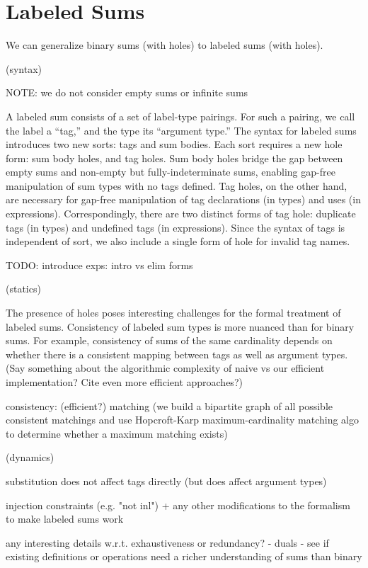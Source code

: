 \section{Labeled Sums}

We can generalize binary sums (with holes) to labeled sums (with holes).

(syntax)






NOTE: we do not consider empty sums or infinite sums

A labeled sum consists of a set of label-type pairings.
For such a pairing, we call the label a ``tag,'' and the type its ``argument type.''
The syntax for labeled sums introduces two new sorts: tags and sum bodies.
Each sort requires a new hole form: sum body holes, and tag holes.
Sum body holes bridge the gap between empty sums and non-empty but fully-indeterminate sums, enabling gap-free manipulation of sum types with no tags defined.
Tag holes, on the other hand, are necessary for gap-free manipulation of tag declarations (in types) and uses (in expressions).
Correspondingly, there are two distinct forms of tag hole: duplicate tags (in types) and undefined tags (in expressions).
Since the syntax of tags is independent of sort, we also include a single form of hole for invalid tag names.

TODO: introduce exps: intro vs elim forms

(statics)

The presence of holes poses interesting challenges for the formal treatment of labeled sums.
Consistency of labeled sum types is more nuanced than for binary sums.
For example, consistency of sums of the same cardinality depends on whether there is a consistent mapping between tags as well as argument types.
(Say something about the algorithmic complexity of naive vs our efficient implementation? Cite even more efficient approaches?)

consistency: (efficient?) matching (we build a bipartite graph of all possible consistent matchings and use Hopcroft-Karp maximum-cardinality matching algo to determine whether a maximum matching exists)


(dynamics)

substitution does not affect tags directly (but does affect argument types)

injection constraints (e.g. "not inl")
+ any other modifications to the formalism to make labeled sums work

any interesting details w.r.t. exhaustiveness or redundancy?
- duals
- see if existing definitions or operations need a richer understanding of sums than binary
